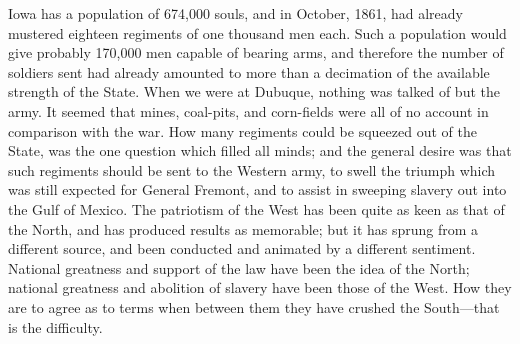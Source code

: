 Iowa has a population of 674,000 souls, and in October, 1861, had
already mustered eighteen regiments of one thousand men each.  Such
a population would give probably 170,000 men capable of bearing
arms, and therefore the number of soldiers sent had already
amounted to more than a decimation of the available strength of the
State.  When we were at Dubuque, nothing was talked of but the
army.  It seemed that mines, coal-pits, and corn-fields were all of
no account in comparison with the war.  How many regiments could be
squeezed out of the State, was the one question which filled all
minds; and the general desire was that such regiments should be
sent to the Western army, to swell the triumph which was still
expected for General Fremont, and to assist in sweeping slavery out
into the Gulf of Mexico.  The patriotism of the West has been quite
as keen as that of the North, and has produced results as
memorable; but it has sprung from a different source, and been
conducted and animated by a different sentiment.  National
greatness and support of the law have been the idea of the North;
national greatness and abolition of slavery have been those of the
West.  How they are to agree as to terms when between them they
have crushed the South---that is the difficulty.

